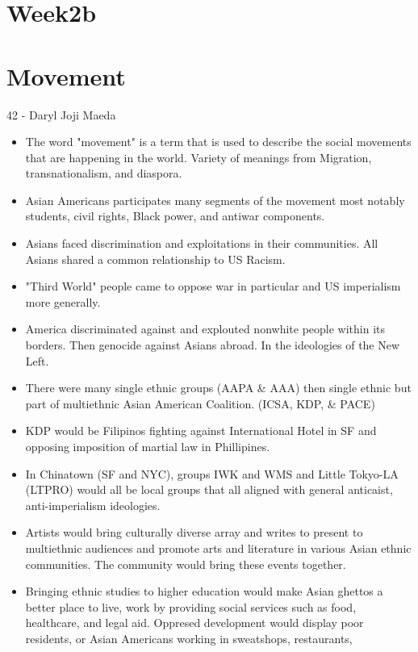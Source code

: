 \documentclass{article}
\begin{document}
\pagebreak

\section*{Week2b}
\section{Movement}
42 - Daryl Joji Maeda
\begin{itemize}
  \item The word "movement" is a term that is used to describe
    the social movements that are happening in the world.
    Variety of meanings from Migration, transnationalism,
    and diaspora.
  \item Asian Americans participates many segments of the movement
    most notably students, civil rights, Black power,
    and antiwar components.
  \item Asians faced discrimination and exploitations
    in their communities. All Asians shared a common relationship
    to US Racism.
  \item "Third World" people came to oppose war in particular
    and US imperialism more generally.
  \item America discriminated against and explouted
    nonwhite people within its borders. Then genocide
    against Asians abroad. In the ideologies of the New Left.
  \item There were many single ethnic groups (AAPA \& AAA) then
    single ethnic but part of multiethnic Asian American Coalition. (ICSA, KDP, \& PACE)
  \item KDP would be Filipinos fighting against International Hotel in SF
    and opposing imposition of martial law in Phillipines.
  \item In Chinatown (SF and NYC), groups IWK and WMS and Little Tokyo-LA (LTPRO)
    would all be local groups that all aligned with general
    anticaist, anti-imperialism ideologies.
  \item Artists would bring culturally diverse array and writes to present
    to multiethnic audiences and promote arts and literature in various Asian
    ethnic communities. The community would bring these events together.
  \item Bringing ethnic studies to higher education would make Asian ghettos
    a better place to live, work by providing social services such as
    food, healthcare, and legal aid. Oppresed development would display
    poor residents, or Asian Americans working in sweatshops, restaurants,

\end{itemize}
\end{document}
